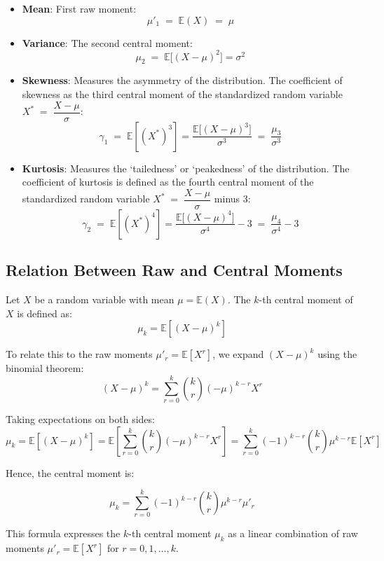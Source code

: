 \documentclass[twoside]{book}
\begin{document}
\begin{itemize}
\item \textbf{Mean}: First raw moment:
    \[
      \mu'_1 \;=\; \mathbb{E}(X) \;=\;\mu
    \]
  \item \textbf{Variance}: The second central moment:
    \[
      \mu_2 \;=\; \mathbb{E}\bigl[(X-\mu)^2\bigr] = \sigma^2
    \]
  \item \textbf{Skewness}:
    Measures the asymmetry of the distribution. The coefficient of skewness as the third central moment of the standardized random variable $X^* \;=\; \dfrac{X - \mu}{\sigma}$:
    \[
      \gamma_1
      \;=\;\mathbb{E}\left[(X^*)^3\right]=
      \frac{\mathbb{E}\bigl[(X-\mu)^3\bigr]}{\sigma^3}
      \;=\;
      \frac{\mu_3}{\sigma^3}
    \]
  \item \textbf{Kurtosis}:
    Measures the `tailedness' or `peakedness' of the distribution. The coefficient of kurtosis is
    defined as the fourth central moment of the standardized random variable $X^* \;=\; \dfrac{X - \mu}{\sigma}$ minus 3:
    \[
      \gamma_2
      \;=\;\mathbb{E}\left[(X^*)^4\right]=
      \frac{\mathbb{E}\bigl[(X-\mu)^4\bigr]}{\sigma^4} - 3
      \;=\;
      \frac{\mu_4}{\sigma^4} - 3
    \]
\end{itemize}

\subsection{Relation Between Raw and Central Moments}

Let \(X\) be a random variable with mean \(\mu = \mathbb{E}(X)\). The $k$-th {central moment} of \(X\) is defined as:
\[
\mu_k = \mathbb{E}[(X - \mu)^k]
\]

To relate this to the raw moments \(\mu'_r = \mathbb{E}[X^r]\), we expand \((X - \mu)^k\) using the binomial theorem:
\[
(X - \mu)^k = \sum_{r=0}^{k} \binom{k}{r} (-\mu)^{k - r} X^r
\]

Taking expectations on both sides:
\[
\mu_k = \mathbb{E}[(X - \mu)^k] 
= \mathbb{E}\left[\sum_{r=0}^{k} \binom{k}{r} (-\mu)^{k - r} X^r\right]
= \sum_{r=0}^{k} (-1)^{k - r}\binom{k}{r} \mu^{k - r} \mathbb{E}[X^r]
\]

Hence, the central moment is:
\begin{textbox}
    \[
\mu_k = \sum_{r=0}^{k} (-1)^{k - r} \binom{k}{r} \mu^{k - r} \mu'_r
\]
\end{textbox}

This formula expresses the $k$-th central moment \(\mu_k\) as a linear combination of raw moments \(\mu'_r = \mathbb{E}[X^r]\) for \(r = 0, 1, \ldots, k\).
\end{document}
